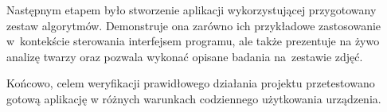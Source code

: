 \par

Następnym etapem było stworzenie aplikacji wykorzystującej przygotowany zestaw algorytmów. Demonstruje ona zarówno ich przykładowe zastosowanie w~kontekście sterowania interfejsem programu, ale także prezentuje na żywo analizę twarzy oraz pozwala wykonać opisane badania na~zestawie zdjęć.

\par

Końcowo, celem weryfikacji prawidłowego działania projektu przetestowano gotową aplikację w różnych warunkach codziennego użytkowania urządzenia.
